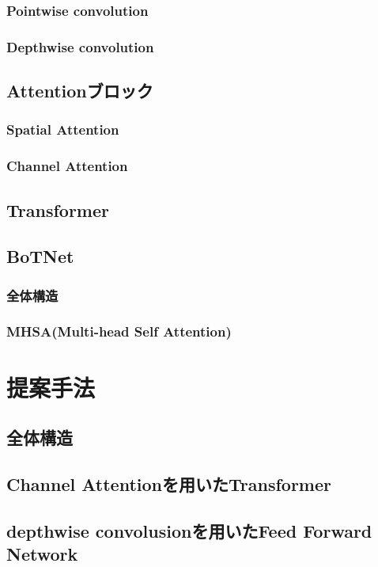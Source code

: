 \subsection{Pointwise convolution}
\subsection{Depthwise convolution}

\section{Attentionブロック}
\subsection{Spatial Attention}
\subsection{Channel Attention}

\section{Transformer}

\section{BoTNet}
\subsection{全体構造}
\subsection{MHSA(Multi-head Self Attention)}

\chapter{提案手法}
\section{全体構造}
\section{Channel Attentionを用いたTransformer}
\section{depthwise convolusionを用いたFeed Forward Network}
